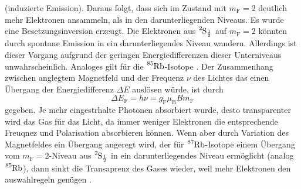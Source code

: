 (induzierte Emission). 
Daraus folgt, dass sich im Zustand mit $m_{\text{F}} = 2$ deutlich mehr Elektronen 
ansammeln, als in den darunterliegenden Niveaus. Es wurde eine Besetzungsinversion 
erzeugt. Die Elektronen aus $\ce{^{2}S_{\frac{1}{2}}}$ auf $m_{\text{F}} = 2$ könnten 
durch spontane Emission in ein darunterliegendes Niveau wandern. Allerdings ist dieser 
Vorgang aufgrund der geringen Energiedifferenzen dieser Unterniveaus 
unwahrscheinlich. 
Analoges gilt für die $\ce{^85Rb}$-Isotope \cite{2}.
Der Zusammenhang zwischen anglegtem Magnetfeld und der Frequenz $\nu$ des Lichtes das
einen Übergang der Energiedifferenz $\Delta E$ auslösen würde, ist durch
\begin{equation}
    \Delta E_{\text{F}} = h \nu = g_{\text{F}} \mu_{\text{B}} B m_{\text{F}}
\end{equation}
gegeben. Je mehr eingestrhalte Photonen absorbiert wurde, desto transparenter wird 
das Gas für das Licht, da immer weniger Elektronen die entsprechende Freuqnez und 
Polarisation absorbieren können. Wenn aber durch Variation des Magnetfeldes ein 
Übergang angeregt wird, der für $\ce{^87Rb}$-Isotope einem Übergang vom 
$m_{\text{F}} = 2$-Niveau aus $\ce{^{2}S_{\frac{1}{2}}}$ in ein darunterliegendes 
Niveau ermöglicht (analog $\ce{^85Rb}$), dann sinkt die Transaprenz des Gases wieder,
weil mehr Elektronen den auswahlregeln genügen \cite{1}.
